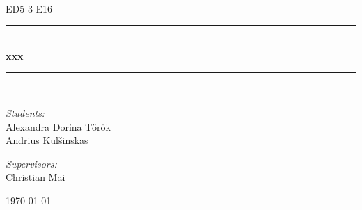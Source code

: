 \newcommand{\HRule}{\rule{\linewidth}{0.5 mm}}
\begin{titlepage}

\begin{center}
\\[0.5cm]

\textsc{\Large ED5-3-E16}\\[0.6cm]

\HRule \\[0.9cm]
{ \Huge \bfseries xxx }\\[0.4cm]

\HRule \\[0.5cm]


\begin{minipage}{0.49\textwidth}
\begin{flushleft} \large
\emph{Students:}\\
Alexandra Dorina Török\\
Andrius Kul\v sinskas\\
\end{flushleft}
\end{minipage}
\begin{minipage}{0.49\textwidth}
\begin{flushright} \large
\emph{Supervisors:} \\
Christian Mai\\
\end{flushright}
\end{minipage}

\vfill

{\large \today}



\end{center}

\end{titlepage}
